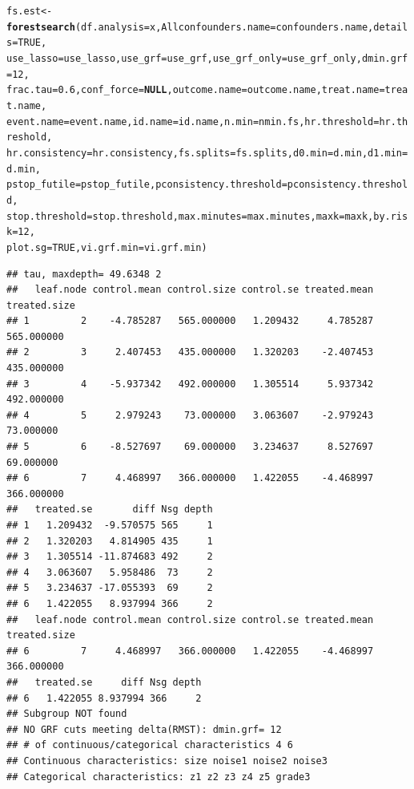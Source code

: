 \documentclass[smallextended]{svjour3}
\makeatletter
\newcommand{\hlnum}[1]{\textcolor[rgb]{0.686,0.059,0.569}{#1}}%
\newcommand{\hlstd}[1]{\textcolor[rgb]{0.345,0.345,0.345}{#1}}%
\newcommand{\hlkwa}[1]{\textcolor[rgb]{0.161,0.373,0.58}{\textbf{#1}}}%
\newcommand{\hlkwb}[1]{\textcolor[rgb]{0.69,0.353,0.396}{#1}}%
\newcommand{\hlkwc}[1]{\textcolor[rgb]{0.333,0.667,0.333}{#1}}%
\newcommand{\hlkwd}[1]{\textcolor[rgb]{0.737,0.353,0.396}{\textbf{#1}}}%
\newenvironment{kframe}{%
 \def\at@end@of@kframe{}%
 \ifinner\ifhmode%
  \def\at@end@of@kframe{\end{minipage}}%
  \begin{minipage}{\columnwidth}%
 \fi\fi%
 \def\FrameCommand##1{\hskip\@totalleftmargin \hskip-\fboxsep
 \colorbox{shadecolor}{##1}\hskip-\fboxsep
     \hskip-\linewidth \hskip-\@totalleftmargin \hskip\columnwidth}%
 \MakeFramed {\advance\hsize-\width
   \@totalleftmargin\z@ \linewidth\hsize
   \@setminipage}}%
 {\par\unskip\endMakeFramed%
 \at@end@of@kframe}
\newenvironment{knitrout}{}{} %
\makeatother
\begin{document}
\begin{knitrout}
\begin{kframe}
\begin{alltt}
\hlstd{fs.est} \hlkwb{<-} \hlkwd{forestsearch}\hlstd{(}\hlkwc{df.analysis} \hlstd{= x,} \hlkwc{Allconfounders.name} \hlstd{= confounders.name,} \hlkwc{details} \hlstd{=} \hlnum{TRUE}\hlstd{,}
    \hlkwc{use_lasso} \hlstd{= use_lasso,} \hlkwc{use_grf} \hlstd{= use_grf,} \hlkwc{use_grf_only} \hlstd{= use_grf_only,} \hlkwc{dmin.grf} \hlstd{=} \hlnum{12}\hlstd{,}
    \hlkwc{frac.tau} \hlstd{=} \hlnum{0.6}\hlstd{,} \hlkwc{conf_force} \hlstd{=} \hlkwa{NULL}\hlstd{,} \hlkwc{outcome.name} \hlstd{= outcome.name,} \hlkwc{treat.name} \hlstd{= treat.name,}
    \hlkwc{event.name} \hlstd{= event.name,} \hlkwc{id.name} \hlstd{= id.name,} \hlkwc{n.min} \hlstd{= nmin.fs,} \hlkwc{hr.threshold} \hlstd{= hr.threshold,}
    \hlkwc{hr.consistency} \hlstd{= hr.consistency,} \hlkwc{fs.splits} \hlstd{= fs.splits,} \hlkwc{d0.min} \hlstd{= d.min,} \hlkwc{d1.min} \hlstd{= d.min,}
    \hlkwc{pstop_futile} \hlstd{= pstop_futile,} \hlkwc{pconsistency.threshold} \hlstd{= pconsistency.threshold,}
    \hlkwc{stop.threshold} \hlstd{= stop.threshold,} \hlkwc{max.minutes} \hlstd{= max.minutes,} \hlkwc{maxk} \hlstd{= maxk,} \hlkwc{by.risk} \hlstd{=} \hlnum{12}\hlstd{,}
    \hlkwc{plot.sg} \hlstd{=} \hlnum{TRUE}\hlstd{,} \hlkwc{vi.grf.min} \hlstd{= vi.grf.min)}
\end{alltt}
\begin{verbatim}
## tau, maxdepth= 49.6348 2 
##   leaf.node control.mean control.size control.se treated.mean treated.size
## 1         2    -4.785287   565.000000   1.209432     4.785287   565.000000
## 2         3     2.407453   435.000000   1.320203    -2.407453   435.000000
## 3         4    -5.937342   492.000000   1.305514     5.937342   492.000000
## 4         5     2.979243    73.000000   3.063607    -2.979243    73.000000
## 5         6    -8.527697    69.000000   3.234637     8.527697    69.000000
## 6         7     4.468997   366.000000   1.422055    -4.468997   366.000000
##   treated.se       diff Nsg depth
## 1   1.209432  -9.570575 565     1
## 2   1.320203   4.814905 435     1
## 3   1.305514 -11.874683 492     2
## 4   3.063607   5.958486  73     2
## 5   3.234637 -17.055393  69     2
## 6   1.422055   8.937994 366     2
##   leaf.node control.mean control.size control.se treated.mean treated.size
## 6         7     4.468997   366.000000   1.422055    -4.468997   366.000000
##   treated.se     diff Nsg depth
## 6   1.422055 8.937994 366     2
## Subgroup NOT found 
## NO GRF cuts meeting delta(RMST): dmin.grf= 12 
## # of continuous/categorical characteristics 4 6 
## Continuous characteristics: size noise1 noise2 noise3 
## Categorical characteristics: z1 z2 z3 z4 z5 grade3 

\end{verbatim}
\end{kframe}
\end{knitrout}
\end{document}
